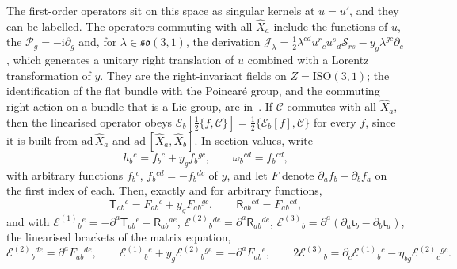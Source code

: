 The first-order operators sit on this space as singular kernels at \(u=u'\), and they can be labelled. The operators commuting with all \(\hat X_a\) include the functions of \(u\), the \(\mathcal P_g=-\mathrm i\partial_g\) and, for \(\lambda\in\mathfrak{so}(3,1)\), the derivation \(\mathcal J_\lambda=\tfrac12\lambda^{cd}u^{r}{}_cu^{s}{}_d\mathcal S_{rs}-y_g\lambda^{gc}\partial_c\), which generates a unitary right translation of \(u\) combined with a Lorentz transformation of \(y\). They are the right-invariant fields on \(Z=\mathrm{ISO}(3,1)\); the identification of the flat bundle with the Poincar\'e group, and the commuting right action on a bundle that is a Lie group, are in~\cite{Hanada2006}. If \(\mathcal C\) commutes with all \(\hat X_a\), then the linearised operator obeys \(\mathcal E_b[\tfrac12\{f,\mathcal C\}]=\tfrac12\{\mathcal E_b[f],\mathcal C\}\) for every \(f\), since it is built from \(\mathrm{ad}\,\hat X_a\) and \(\mathrm{ad}\,[\hat X_a,\hat X_b]\). In section values, write
\[
h_b{}^c=f_b{}^c+y_gf_b{}^{gc},\qquad\omega_b{}^{cd}=f_b{}^{cd},
\]
with arbitrary functions \(f_b{}^c\), \(f_b{}^{cd}=-f_b{}^{dc}\) of \(y\), and let \(F\) denote \(\partial_af_b-\partial_bf_a\) on the first index of each. Then, exactly and for arbitrary functions,
\[
\mathsf T_{ab}{}^c=F_{ab}{}^c+y_gF_{ab}{}^{gc},\qquad\mathsf R_{ab}{}^{cd}=F_{ab}{}^{cd},
\]
and with \(\mathcal E^{(1)}{}_b{}^e=-\partial^a\mathsf T_{ab}{}^e+\mathsf R_{ab}{}^{ae}\), \(\mathcal E^{(2)}{}_b{}^{de}=\partial^a\mathsf R_{ab}{}^{de}\), \(\mathcal E^{(3)}{}_b=\partial^a(\partial_a\mathsf t_b-\partial_b\mathsf t_a)\), the linearised brackets of the matrix equation,
\[
\mathcal E^{(2)}{}_b{}^{de}=\partial^aF_{ab}{}^{de},\qquad
\mathcal E^{(1)}{}_b{}^e+y_g\mathcal E^{(2)}{}_b{}^{ge}=-\partial^aF_{ab}{}^e,\qquad
2\mathcal E^{(3)}{}_b=\partial_c\mathcal E^{(1)}{}_b{}^c-\eta_{bg}\mathcal E^{(2)}{}_c{}^{gc}.
\]
